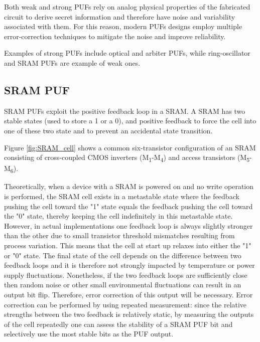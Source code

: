Both weak and strong PUFs rely on analog physical properties of the fabricated circuit to derive secret information and therefore have noise and variability associated with them. For this reason, modern PUFs designs employ multiple error-correction techniques to mitigate the noise and improve reliability.

Examples of strong PUFs include optical and arbiter PUFs, while ring-oscillator and SRAM PUFs are example of weak ones. \cite{PUF_IEEE_Herder}

\subsection{SRAM PUF}
SRAM PUFs exploit the positive feedback loop in a SRAM. A SRAM has two stable states (used to store a 1 or a 0), and positive feedback to force the cell into one of these two state and to prevent an accidental state transition. 

Figure \ref{fig:SRAM_cell} shows a common six-transistor configuration of an SRAM consisting of cross-coupled CMOS inverters (M\textsubscript{1}-M\textsubscript{4}) and access transistors (M\textsubscript{5}-M\textsubscript{6}).

Theoretically, when a device with a SRAM is powered on and no write operation is performed, the SRAM cell exists in a metastable state where the feedback pushing the cell toward the "1" state equals the feedback pushing the cell toward the "0" state, thereby keeping the cell indefinitely in this metastable state. However, in actual implementations one feedback loop is always slightly stronger than the other due to small transistor threshold mismatches resulting from process variation. This means that the cell at start up relaxes into either the "1" or "0" state. The final state of the cell depends on the difference between two feedback loops and it is therefore not strongly impacted by temperature or power supply fluctuations. Nonetheless, if the two feedback loops are sufficiently close then random noise or other small environmental fluctuations can result in an output bit flip. Therefore, error correction of this output will be necessary. Error correction can be performed by using repeated measurement: since the relative strengths between the two feedback is relatively static, by measuring the outputs of the cell repeatedly one can assess the stability of a SRAM PUF bit and selectively use the most stable bits as the PUF output. \cite{PUF_IEEE_Herder}

